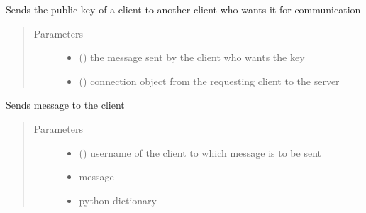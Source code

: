 \documentclass[letterpaper,10pt,english]{sphinxmanual}
\begin{document}

\begin{fulllineitems}
\label{\detokenize{server:server.send_key}}
Sends the public key of a client to another client who wants it for communication
\begin{quote}\begin{description}
\item[{Parameters}] \leavevmode\begin{itemize}
\item {} 
 () \textendash{} the message sent by the client who wants the key

\item {} 
 () \textendash{} connection object from the requesting client to the server

\end{itemize}

\end{description}\end{quote}

\end{fulllineitems}


\begin{fulllineitems}
\label{\detokenize{server:server.send_text}}
Sends message to the client
\begin{quote}\begin{description}
\item[{Parameters}] \leavevmode\begin{itemize}
\item {} 
 () \textendash{} username of the client to which message is to be sent

\item {} 
 \textendash{} message

\item {} 
 \textendash{} python dictionary

\end{itemize}

\end{description}\end{quote}

\end{fulllineitems}
\end{document}

